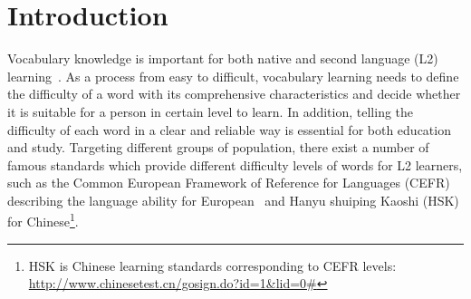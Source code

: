 \section{Introduction}
\label{sec:intro}

Vocabulary knowledge is important for both native and second language (L2) learning~\cite{grabe1991current,alqahtani2015importance}.
As a process from easy to difficult, vocabulary learning needs to define the difficulty of a word with its comprehensive characteristics and decide whether it is suitable for a person in certain level to learn.
In addition, telling the difficulty of each word in a clear and reliable way is essential for both education and study.
Targeting different groups of population, 
there exist a number of famous standards which provide different difficulty levels of words for L2 learners, 
such as the Common European Framework of Reference for Languages (CEFR) describing the language ability for European~\cite{little2006common,little2011common}
and Hanyu shuiping Kaoshi (HSK) for Chinese\footnote{HSK is Chinese learning standards corresponding to CEFR levels: \url{http://www.chinesetest.cn/gosign.do?id=1&lid=0#}}.


